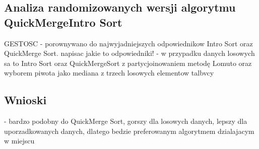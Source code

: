 \subsection{Analiza randomizowanych wersji algorytmu QuickMergeIntro Sort}

GESTOSC
- porownywano do najwyjadniejszych odpowiednikow Intro Sort oraz QuickMerge Sort. napisac jakie to odpowiedniki!
- w przypadku danych losowych sa to Intro Sort oraz QuickMergeSort z partycjoinowaniem metodę Lomuto oraz wyborem piwota jako mediana z trzech losowych elementow talbvcy 

\begin{figure}[]
	\centering
	
	\caption[]{}
	\label{fig:quick-merge-intro-sort-nondeterministic-pivot-density}
\end{figure}

\begin{figure}[]
	\centering
	
	\caption[]{}
	\label{fig:quick-merge-intro-sort-nondeterministic-pivot-density-sorted}
\end{figure}

\subsection{Wnioski}
- bardzo podobny do QuickMerge Sort, gorszy dla losowych danych, lepszy dla uporzadkowanych danych, dlatego bedzie preferowanym algorytmem dzialajacym w miejscu